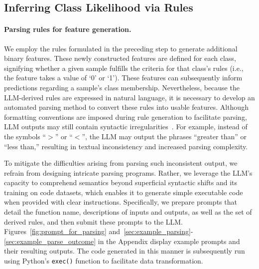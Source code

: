 \subsection{Inferring Class Likelihood via Rules}
\label{Sec:training}

\paragraph{Parsing rules for feature generation.} We employ the rules formulated in the preceding step to generate additional binary features. These newly constructed features are defined for each class, signifying whether a given sample fulfills the criteria for that class’s rules (i.e., the feature takes a value of ‘0’ or ‘1’). These features can subsequently inform predictions regarding a sample's class membership. Nevertheless, because the LLM-derived rules are expressed in natural language, it is necessary to develop an automated parsing method to convert these rules into usable features. Although formatting conventions are imposed during rule generation to facilitate parsing, LLM outputs may still contain syntactic irregularities~\cite{kovavc2023large}. For example, instead of the symbols ``$>$” or ``$<$”, the LLM may output the phrases “greater than” or “less than,” resulting in textual inconsistency and increased parsing complexity.

To mitigate the difficulties arising from parsing such inconsistent output, we refrain from designing intricate parsing programs. Rather, we leverage the LLM’s capacity to comprehend semantics beyond superficial syntactic shifts and its training on code datasets, which enables it to generate simple executable code when provided with clear instructions. Specifically, we prepare prompts that detail the function name, descriptions of inputs and outputs, as well as the set of derived rules, and then submit these prompts to the LLM. Figures~\ref{fig:prompt_for_parsing} and~\ref{sec:example_parsing}-\ref{sec:example_parse_outcome} in the Appendix display example prompts and their resulting outputs. The code generated in this manner is subsequently run using Python’s \texttt{exec()} function to facilitate data transformation.

\vspace*{-0.12in}

